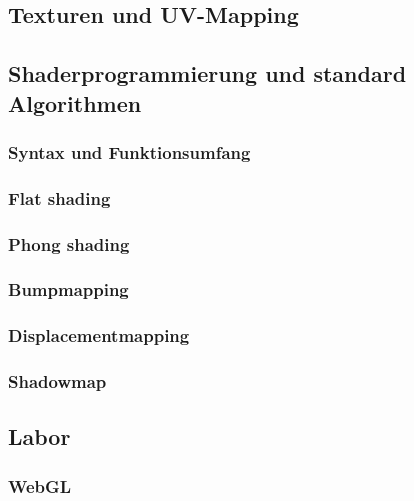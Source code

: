 \subsection{Texturen und UV-Mapping}
\subsection{Shaderprogrammierung und standard Algorithmen}
\subsubsection{Syntax und Funktionsumfang}
\subsubsection{Flat  shading}
\subsubsection{Phong  shading}
\subsubsection{Bumpmapping}
\subsubsection{Displacementmapping}
\subsubsection{Shadowmap}

\subsection{Labor}
\subsubsection{WebGL}
